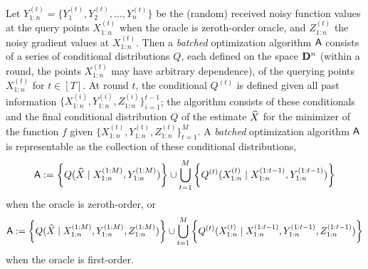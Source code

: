 Let $Y_{1:n}^{(t)} = \{Y_1^{(t)},Y_2^{(t)}, \ldots, Y_n^{(t)}\}$ be the
(random) received noisy function values at the query points $X_{1:n}^{(t)}$
when the oracle is zeroth-order oracle, and $Z_{1:n}^{(t)}$ the noisy
gradient values at $X_{1:n}^{(t)}$. Then a \emph{batched} optimization
algorithm $\mathsf{A}$ consists of a series of conditional distributions $Q$, each
defined on the space $\mathbf{D}^n$ (within a round, the points
$X_{1:n}^{(t)}$ may have arbitrary dependence), of the querying points
$X_{1:n}^{(t)}$ for $t\in [T]$. At round $t$, the conditional $Q^{(t)}$ is
defined given all past information $\{X_{1:n}^{(i)}, Y_{1:n}^{(i)},
Z_{1:n}^{(i)}\}_{i=1}^{t-1}$; the algorithm consists of these conditionals
and the final conditional distribution $Q$ of the estimate
$\widehat{X}$ for the minimizer of the function $f$ given $\{X_{1:n}^{(t)},
Y_{1:n}^{(t)}, Z_{1:n}^{(t)}\}_{t=1}^{M}$.  A \emph{batched}
optimization algorithm $\mathsf{A}$ is representable as the collection of these
conditional distributions,
% 
%
%
\begin{equation}
  \label{eqn:alg-zo}
  \mathsf{A} := \bigg\{
  Q(\widehat{X}\mid X_{1:n}^{(1:M)}, Y_{1:n}^{(1:M)})
  \bigg\}
  \cup
  \bigcup_{t=1}^M 
  \bigg\{
  Q^{(t)}(X_{1:n}^{(t)}
  \mid X_{1:n}^{(1:t-1)}, Y_{1:n}^{(1:t-1)})
  \bigg\}
\end{equation}
when the oracle is zeroth-order, or 
\begin{equation}
\label{eqn:alg-fo}
  \mathsf{A} := \bigg\{
  Q(\widehat{X}\mid X_{1:n}^{(1:M)}, Y_{1:n}^{(1:M)}, Z_{1:n}^{(1:M)})
  \bigg\}
  \cup
  \bigcup_{t=1}^M
  \bigg\{
  Q^{(t)}(X_{1:n}^{(t)}
  \mid X_{1:n}^{(1:t-1)}, Y_{1:n}^{(1:t-1)},
  Z_{1:n}^{(1:t-1)})
  \bigg\}
\end{equation}
when the oracle is first-order.

